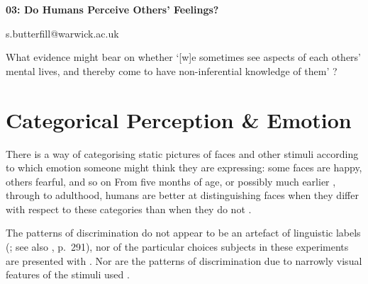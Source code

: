 \documentclass[12pt]{extarticle}
\date{}
\makeatletter
\def \ititle {Philosophical Psychology}
\def \iemail{s.butterfill@warwick.ac.uk}
\makeatother
\begin{document}
\begin{multicols*}{3}

\setlength\footnotesep{1em}









      
\def \ititle {03: Do Humans Perceive Others’ Feelings?}
 
\begin{center}
 
{\Large
 
\textbf{\ititle}
 
}
 
 
 
\iemail %
 
\end{center}
 
 
 
What evidence might bear on whether ‘[w]e sometimes {see} aspects of each others’ mental lives, and thereby come to have non-inferential knowledge of them’ \citealp[p.\ 573]{mcneill:2012_embodiment}?



\section{Categorical Perception \& Emotion}

There is a way of categorising static pictures of faces and other stimuli according to which emotion
someone might think they are expressing: some faces are happy, others fearful, and so on
From five months of age,
or possibly much earlier \citep{field:1982_discrimination},
through to adulthood, humans are better at distinguishing faces when they
differ with respect to these categories than when they do not
\citep{Etcoff:1992zd,Gelder:1997bf,Bornstein:2003vq,Kotsoni:2001ph,cheal:2011_categorical,hoonhorst:2011_categoricala}.

The patterns of discrimination do not appear to be an artefact of linguistic labels
(\citealp{sauter:2011_categorical}; see also \citealp{laukka:2005_categorical}, p.\ 291),%
nor of the particular choices subjects in these experiments are presented with \citep{bimler:2001_categorical,fujimura:2011_categorical}.
Nor are the patterns of discrimination due to narrowly visual features of the stimuli used \citep{sato:2009_detection}.


\end{multicols*}
\end{document}
